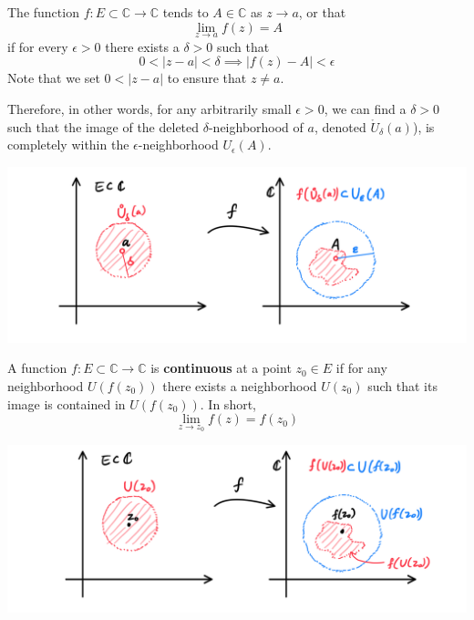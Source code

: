       \begin{definition}
        The function $f: E \subset \mathbb{C} \longrightarrow \mathbb{C}$ tends to $A \in \mathbb{C}$ as $z \rightarrow a$, or that
        \[\lim_{z \rightarrow a} f(z) = A\]
        if for every $\epsilon > 0$ there exists a $\delta > 0$ such that
        \[0<|z - a|<\delta \implies |f(z) - A|<\epsilon\]
        Note that we set $0<|z - a|$ to ensure that $z \neq a$. 

        Therefore, in other words, for any arbitrarily small $\epsilon>0$, we can find a $\delta > 0$ such that the image of the deleted $\delta$-neighborhood of $a$, denoted $\mathring{U}_\delta (a)$), is completely within the $\epsilon$-neighborhood $U_\epsilon (A)$. 
        \begin{center}
            \includegraphics[scale=0.25]{img/Limit_of_Complex_Function.PNG}
        \end{center}
      \end{definition}

      \begin{definition}
        A function $f: E \subset \mathbb{C} \longrightarrow \mathbb{C}$ is \textbf{continuous} at a point $z_0 \in E$ if for any neighborhood $U(f(z_0))$ there exists a neighborhood $U(z_0)$ such that its image is contained in $U(f(z_0))$. In short, 
        \[\lim_{z \longrightarrow z_0} f(z) = f(z_0)\]
        \begin{center}
          \includegraphics[scale=0.25]{img/Continuity_of_Complex_Function.PNG}
        \end{center}
      \end{definition}

